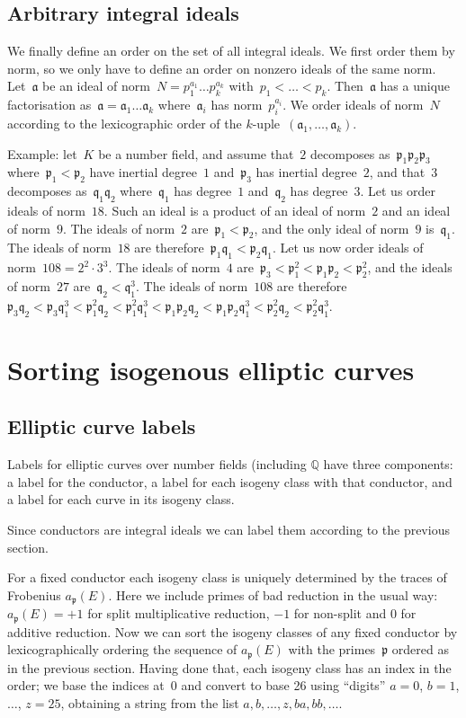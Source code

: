 \documentclass{article}
\def\Q{{\mathbb Q}}
\def\a{{\mathfrak a}}
\def\p{{\mathfrak p}}
\def\q{{\mathfrak q}}
\begin{document}
\subsection{Arbitrary integral ideals}

We finally define an order on the set of all integral ideals. We first order
them by norm, so we only have to define an order on nonzero ideals of the same
norm. Let~$\a$ be an ideal of norm~$N = p_1^{a_1}\dots p_k^{a_k}$ with~$p_1 <
\dots < p_k$. Then~$\a$ has a unique factorisation as~$\a = \a_1\dots\a_k$
where~$\a_i$ has norm~$p_i^{a_i}$. We order ideals of norm~$N$ according to the
lexicographic order of the $k$-uple~$(\a_1,\dots,\a_k)$.

Example: let~$K$ be a number field, and assume that~$2$ decomposes
as~$\p_1\p_2\p_3$ where~$\p_1<\p_2$ have inertial degree~$1$ and~$\p_3$ has
inertial degree~$2$, and that~$3$ decomposes as~$\q_1\q_2$ where~$\q_1$ has
degree~$1$ and~$\q_2$ has degree~$3$. Let us order ideals of norm~$18$. Such an
ideal is a product of an ideal of norm~$2$ and an ideal of norm~$9$. The ideals
of norm~$2$ are~$\p_1 < \p_2$, and the only ideal of norm~$9$ is~$\q_1$. The
ideals of norm~$18$ are therefore~$\p_1\q_1 < \p_2\q_1$. Let us now order ideals
of norm~$108 = 2^2\cdot 3^3$. The ideals of norm~$4$ are~$\p_3 < \p_1^2 < \p_1\p_2 <
\p_2^2$, and the ideals of norm~$27$ are~$\q_2 < \q_1^3$. The ideals of
norm~$108$ are therefore~$\p_3\q_2 < \p_3\q_1^3 < \p_1^2\q_2 < \p_1^2\q_1^3 <
\p_1\p_2\q_2 < \p_1\p_2\q_1^3 < \p_2^2\q_2 < \p_2^2\q_1^3$.

\section{Sorting isogenous elliptic curves}

\subsection{Elliptic curve labels}

Labels for elliptic curves over number fields (including $\Q$ have
three components: a label for the conductor, a label for each isogeny
class with that conductor, and a label for each curve in its isogeny
class.

Since conductors are integral ideals we can label them according to
the previous section.

For a fixed conductor each isogeny class is uniquely determined by the
traces of Frobenius $a_{\p}(E)$.  Here we include primes of bad
reduction in the usual way: $a_{\p}(E)=+1$ for split multiplicative
reduction, $-1$ for non-split and $0$ for additive reduction.  Now we
can sort the isogeny classes of any fixed conductor by
lexicographically ordering the sequence of $a_{\p}(E)$ with the
primes~$\p$ ordered as in the previous section.  Having done that,
each isogeny class has an index in the order; we base the indices
at~$0$ and convert to base 26 using ``digits'' $a=0$, $b=1$, $\dots$,
$z=25$, obtaining a string from the list $a, b, \dots, z, ba, bb,
\dots$.
\end{document}
